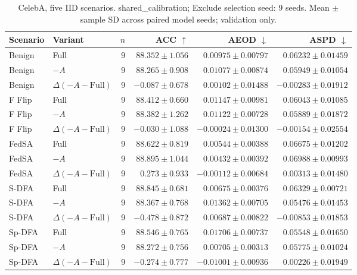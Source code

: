 \begin{table}[t]
\centering
\small
\caption{CelebA, five IID scenarios. shared\_calibration; Exclude selection seed: 9 seeds. Mean $\pm$ sample SD across paired model seeds; validation only.}
\begin{tabular}{llrrrr}
\toprule
Scenario & Variant & $n$ & ACC $\uparrow$ & AEOD $\downarrow$ & ASPD $\downarrow$ \\
\midrule
Benign & Full & 9 & $88.352 \pm 1.056$ & $0.00975 \pm 0.00797$ & $0.06232 \pm 0.01459$ \\
Benign & $-A$ & 9 & $88.265 \pm 0.908$ & $0.01077 \pm 0.00874$ & $0.05949 \pm 0.01054$ \\
Benign & $\Delta(-A-\mathrm{Full})$ & 9 & $-0.087 \pm 0.678$ & $0.00102 \pm 0.01488$ & $-0.00283 \pm 0.01912$ \\
F Flip & Full & 9 & $88.412 \pm 0.660$ & $0.01147 \pm 0.00981$ & $0.06043 \pm 0.01085$ \\
F Flip & $-A$ & 9 & $88.382 \pm 1.262$ & $0.01122 \pm 0.00728$ & $0.05889 \pm 0.01872$ \\
F Flip & $\Delta(-A-\mathrm{Full})$ & 9 & $-0.030 \pm 1.088$ & $-0.00024 \pm 0.01300$ & $-0.00154 \pm 0.02554$ \\
FedSA & Full & 9 & $88.622 \pm 0.819$ & $0.00544 \pm 0.00388$ & $0.06675 \pm 0.01202$ \\
FedSA & $-A$ & 9 & $88.895 \pm 1.044$ & $0.00432 \pm 0.00392$ & $0.06988 \pm 0.00993$ \\
FedSA & $\Delta(-A-\mathrm{Full})$ & 9 & $0.273 \pm 0.933$ & $-0.00112 \pm 0.00684$ & $0.00313 \pm 0.01480$ \\
S-DFA & Full & 9 & $88.845 \pm 0.681$ & $0.00675 \pm 0.00376$ & $0.06329 \pm 0.00721$ \\
S-DFA & $-A$ & 9 & $88.367 \pm 0.768$ & $0.01362 \pm 0.00705$ & $0.05476 \pm 0.01453$ \\
S-DFA & $\Delta(-A-\mathrm{Full})$ & 9 & $-0.478 \pm 0.872$ & $0.00687 \pm 0.00822$ & $-0.00853 \pm 0.01853$ \\
Sp-DFA & Full & 9 & $88.546 \pm 0.765$ & $0.01706 \pm 0.00737$ & $0.05548 \pm 0.01650$ \\
Sp-DFA & $-A$ & 9 & $88.272 \pm 0.756$ & $0.00705 \pm 0.00313$ & $0.05775 \pm 0.01024$ \\
Sp-DFA & $\Delta(-A-\mathrm{Full})$ & 9 & $-0.274 \pm 0.777$ & $-0.01001 \pm 0.00936$ & $0.00226 \pm 0.01949$ \\
\bottomrule
\end{tabular}
\end{table}

